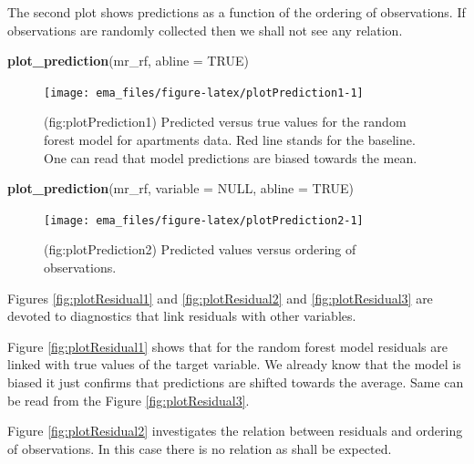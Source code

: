 \documentclass[12pt,]{krantz}
\newenvironment{Shaded}{\begin{snugshade}}{\end{snugshade}}
\newcommand{\DataTypeTok}[1]{\textcolor[rgb]{0.13,0.29,0.53}{#1}}
\newcommand{\KeywordTok}[1]{\textcolor[rgb]{0.13,0.29,0.53}{\textbf{#1}}}
\newcommand{\NormalTok}[1]{#1}
\newcommand{\OtherTok}[1]{\textcolor[rgb]{0.56,0.35,0.01}{#1}}
\begin{document}
The second plot shows predictions as a function of the ordering of observations. If observations are randomly collected then we shall not see any relation.

\begin{Shaded}
\begin{Highlighting}[]
\KeywordTok{plot_prediction}\NormalTok{(mr_rf, }\DataTypeTok{abline =} \OtherTok{TRUE}\NormalTok{)}
\end{Highlighting}
\end{Shaded}

\begin{figure}

{\centering \texttt{[image: ema\_files/figure-latex/plotPrediction1-1]} 

}

\caption{(fig:plotPrediction1) Predicted versus true values for the random forest model for apartments data. Red line stands for the baseline. One can read that model predictions are biased towards the mean.}\label{fig:plotPrediction1}
\end{figure}

\begin{Shaded}
\begin{Highlighting}[]
\KeywordTok{plot_prediction}\NormalTok{(mr_rf, }\DataTypeTok{variable =} \OtherTok{NULL}\NormalTok{, }\DataTypeTok{abline =} \OtherTok{TRUE}\NormalTok{)}
\end{Highlighting}
\end{Shaded}

\begin{figure}

{\centering \texttt{[image: ema\_files/figure-latex/plotPrediction2-1]} 

}

\caption{(fig:plotPrediction2) Predicted values versus ordering of observations. }\label{fig:plotPrediction2}
\end{figure}

Figures \ref{fig:plotResidual1} and \ref{fig:plotResidual2} and \ref{fig:plotResidual3} are devoted to diagnostics that link residuals with other variables.

Figure \ref{fig:plotResidual1} shows that for the random forest model residuals are linked with true values of the target variable. We already know that the model is biased it just confirms that predictions are shifted towards the average. Same can be read from the Figure \ref{fig:plotResidual3}.

Figure \ref{fig:plotResidual2} investigates the relation between residuals and ordering of observations. In this case there is no relation as shall be expected.
\end{document}
